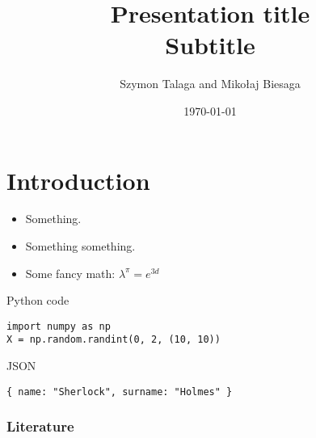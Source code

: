 \title[Presentation]{
    Presentation title \\
    \small{Subtitle}
}
\author[]{Szymon Talaga and Mikołaj Biesaga} %
\date{\today} %

\frame{\titlepage}

\section{Introduction}

\begin{frame}
\begin{itemize}
    \frametitle{Yada, yada, yada \ldots}
    \item Something.
    \item Something something.
    \item Some fancy math: $\lambda^\pi = e^{3d}$
\end{itemize}
\end{frame}

\begin{frame}[fragile]{Python code}
\begin{verbatim}
import numpy as np
X = np.random.randint(0, 2, (10, 10))
\end{verbatim}
\end{frame}

\begin{frame}[fragile]{JSON}
\begin{verbatim}
{ name: "Sherlock", surname: "Holmes" }
\end{verbatim}
\end{frame}

\begin{frame}[allowframebreaks]
\frametitle{Literature}
\nocite{*}
\AtNextBibliography{\footnotesize}
\printbibliography[title=Literature]
\end{frame}
